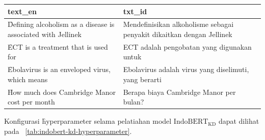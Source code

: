 \begin{table}[!ht]
    \centering
    \label{tab:sentence-parallel}
    \begin{tabular}{|p{7cm}|p{7cm}|}
        \hline
        \textbf{text\_en} & \textbf{txt\_id} \\
        \hline
        \f{Defining alcoholism as a disease is associated with Jellinek} & Mendefinisikan alkoholisme sebagai penyakit dikaitkan dengan Jellinek \\
        \hline
        \f{ECT is a treatment that is used for} & ECT adalah pengobatan yang digunakan untuk \\
        \hline
        \f{Ebolavirus is an enveloped virus, which means} & Ebolavirus adalah virus yang diselimuti, yang berarti \\
        \hline
        \f{How much does Cambridge Manor cost per month} & Berapa biaya Cambridge Manor per bulan? \\
        \hline
    \end{tabular}
\end{table}

Konfigurasi \f{hyperparameter} selama pelatiahan model $\text{IndoBERT}_{\text{KD}}$ dapat  dilihat pada \tab~\ref{tab:indobert-kd-hyperparameter}.

